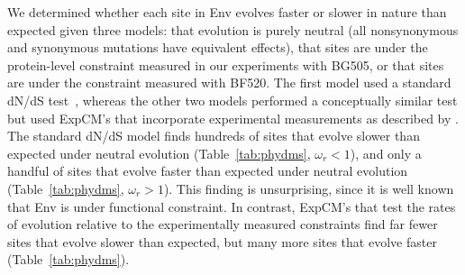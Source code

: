 \documentclass[9pt]{elife}
\begin{document}
\begin{figure}
\end{figure}

We determined whether each site in Env evolves faster or slower in nature than expected given three models: that evolution is purely neutral (all nonsynonymous and synonymous mutations have equivalent effects), that sites are under the protein-level constraint measured in our experiments with BG505, or that sites are under the constraint measured with BF520. 
The first model used a standard dN/dS test~\citep[the ``FEL'' method of][]{kosakovsky2005not}, whereas the other two models performed a conceptually similar test but used ExpCM's that incorporate experimental measurements as described by \citet{bloom2017identification}.
The standard dN/dS model finds hundreds of sites that evolve slower than expected under neutral evolution (Table~\ref{tab:phydms}, $\omega_r < 1$), and only a handful of sites that evolve faster than expected under neutral evolution (Table~\ref{tab:phydms}, $\omega_r > 1$).
This finding is unsurprising, since it is well known that Env is under functional constraint.
In contrast, ExpCM's that test the rates of evolution relative to the experimentally measured constraints find far fewer sites that evolve slower than expected, but many more sites that evolve faster (Table~\ref{tab:phydms}). 
\end{document}
